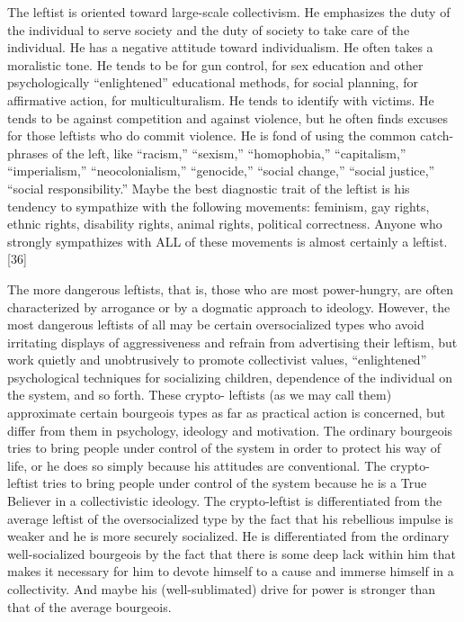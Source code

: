  The leftist is oriented toward large-scale collectivism. He emphasizes the duty of the individual to serve society and the duty of society to take care of the individual. He has a negative attitude toward individualism. He often takes a moralistic tone. He tends to be for gun control, for sex education and other psychologically “enlightened” educational methods, for social planning, for affirmative action, for multiculturalism. He tends to identify with victims. He tends to be against competition and against violence, but he often finds excuses for those leftists who do commit violence. He is fond of using the common catch- phrases of the left, like “racism,” “sexism,” “homophobia,” “capitalism,” “imperialism,” “neocolonialism,” “genocide,” “social change,” “social justice,” “social responsibility.” Maybe the best diagnostic trait of the leftist is his tendency to sympathize with the following movements: feminism, gay rights, ethnic rights, disability rights, animal rights, political correctness. Anyone who strongly sympathizes with ALL of these movements is almost certainly a leftist. [36]

 The more dangerous leftists, that is, those who are most power-hungry, are often characterized by arrogance or by a dogmatic approach to ideology. However, the most dangerous leftists of all may be certain oversocialized types who avoid irritating displays of aggressiveness and refrain from advertising their leftism, but work quietly and unobtrusively to promote collectivist values, “enlightened” psychological techniques for socializing children, dependence of the individual on the system, and so forth. These crypto- leftists (as we may call them) approximate certain bourgeois types as far as practical action is concerned, but differ from them in psychology, ideology and motivation. The ordinary bourgeois tries to bring people under control of the system in order to protect his way of life, or he does so simply because his attitudes are conventional. The crypto-leftist tries to bring people under control of the system because he is a True Believer in a collectivistic ideology. The crypto-leftist is differentiated from the average leftist of the oversocialized type by the fact that his rebellious impulse is weaker and he is more securely socialized. He is differentiated from the ordinary well-socialized bourgeois by the fact that there is some deep lack within him that makes it necessary for him to devote himself to a cause and immerse himself in a collectivity. And maybe his (well-sublimated) drive for power is stronger than that of the average bourgeois.

